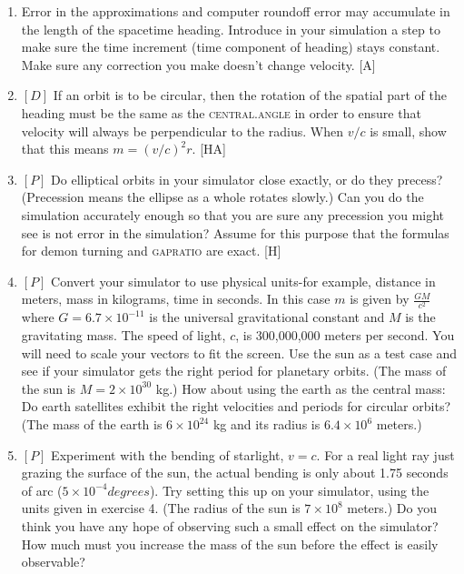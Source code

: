 \documentclass{book}
\begin{document}
\begin{enumerate}
\item Error in the approximations and computer roundoff error may accumulate in the length of the spacetime heading. Introduce in your
simulation a step to make sure the time increment (time component of
heading) stays constant. Make sure any correction you make doesn't
change velocity. [A]

\item $[D]$ If an orbit is to be circular, then the rotation of the spatial part of
the heading must be the same as the \textsc{central}\textsc{.angle} in order to ensure
that velocity will always be perpendicular to the radius. When $v / c$ is
small, show that this means $m = (v/c)^2r$. [HA]

\item $[P]$ Do elliptical orbits in your simulator close exactly, or do they
precess? (Precession means the ellipse as a whole rotates slowly.) Can
you do the simulation accurately enough so that you are sure any precession you might see is not error in the simulation? Assume for this purpose
that the formulas for demon turning and \textsc{gapratio} are exact. [H]

\item $[P]$ Convert your simulator to use physical units-for example, distance in meters, mass in kilograms, time in seconds. In this case $m$
is given by $\frac {GM} {c^2}$ where $G = 6.7 \times 10^{-11}$ is the universal gravitational constant and $M$ is the gravitating mass. The speed of light, $c$, is
300,000,000 meters per second. You will need to scale your vectors to fit
the screen. Use the sun as a test case and see if your simulator gets the
right period for planetary orbits. (The mass of the sun is $M = 2 \times 10^{30}$ kg.) How about using the earth as the central mass: Do earth satellites
exhibit the right velocities and periods for circular orbits? (The mass of
the earth is $6 \times 10^{24}$ kg and its radius is $6.4 \times 10^6$ meters.)

\item $[P]$ Experiment with the bending of starlight, $v = c$. For a real light
ray just grazing the surface of the sun, the actual bending is only about
1.75 seconds of arc ($5 \times 10^{-4} degrees$). Try setting this up on your
simulator, using the units given in exercise 4. (The radius of the sun is
$7 \times 10^8$ meters.) Do you think you have any hope of observing such a
small effect on the simulator? How much must you increase the mass of
the sun before the effect is easily observable?


\end{enumerate}
\end{document}
